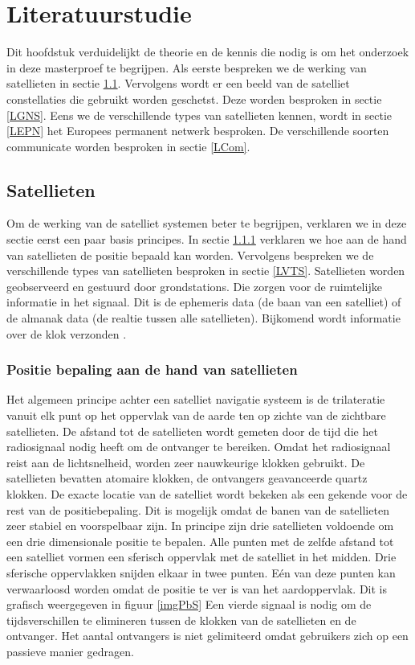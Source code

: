 \chapter{Literatuurstudie}
\label{Literatuurstudie}
Dit hoofdstuk verduidelijkt de theorie en de kennis die nodig is om het onderzoek in deze masterproef te begrijpen. Als eerste bespreken we de werking van satellieten in sectie \ref{LSat}. Vervolgens wordt er een beeld van de satelliet constellaties die gebruikt worden geschetst. Deze worden besproken in sectie \ref{LGNS}. Eens we de verschillende types van satellieten kennen, wordt in sectie \ref{LEPN} het Europees permanent netwerk besproken. De verschillende soorten communicate worden besproken in sectie \ref{LCom}.

\section{Satellieten}
\label{LSat}
Om de werking van de satelliet systemen beter te begrijpen, verklaren we in deze sectie eerst een paar basis principes. In sectie \ref{LPbS} verklaren we hoe aan de hand van satellieten de positie bepaald kan worden. Vervolgens bespreken we de verschillende types van satellieten  besproken in sectie \ref{LVTS}. Satellieten worden geobserveerd en gestuurd door grondstations. Die zorgen voor de ruimtelijke informatie in het signaal. Dit is de ephemeris data (de baan van een satelliet) of de almanak data (de realtie tussen alle satellieten). Bijkomend wordt informatie over de klok verzonden \cite{LBibGNSS8}.

\subsection{Positie bepaling aan de hand van satellieten}
\label{LPbS}
Het algemeen principe achter een satelliet navigatie systeem is de trilateratie vanuit elk punt op het oppervlak van de aarde ten op zichte van de zichtbare satellieten.  De afstand tot de satellieten wordt gemeten door de tijd die het radiosignaal nodig heeft om de ontvanger te bereiken. Omdat het radiosignaal reist aan de lichtsnelheid, worden zeer nauwkeurige klokken gebruikt. De satellieten bevatten atomaire klokken, de ontvangers geavanceerde quartz klokken. De exacte locatie van de satelliet wordt bekeken als een gekende voor de rest van de positiebepaling. Dit is mogelijk omdat de banen van de satellieten zeer stabiel en voorspelbaar zijn. In principe zijn drie satellieten voldoende om een drie dimensionale positie te bepalen. Alle punten met de zelfde afstand tot een satelliet vormen een sferisch oppervlak met de satelliet in het midden. Drie sferische oppervlakken snijden elkaar in twee punten. E\'en van deze punten kan verwaarloosd worden omdat de positie te ver is van het aardoppervlak. Dit is grafisch weergegeven in figuur \ref{imgPbS} Een vierde signaal is nodig om de tijdsverschillen te elimineren tussen de klokken van de satellieten en de ontvanger. Het aantal ontvangers is niet gelimiteerd omdat gebruikers zich op een passieve manier gedragen.
 
